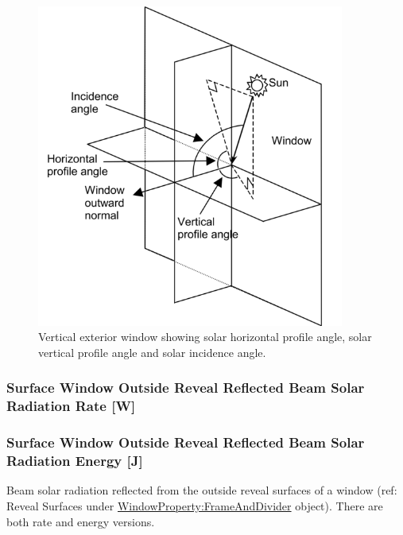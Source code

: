 \begin{figure}[hbtp] %
\centering
\includegraphics[width=0.9\textwidth, height=0.9\textheight, keepaspectratio=true]{media/image058.png}
\caption{Vertical exterior window showing solar horizontal profile angle, solar vertical profile angle and solar incidence angle. \protect \label{fig:vertical-exterior-window-showing-solar}}
\end{figure}

\subsubsection{Surface Window Outside Reveal Reflected Beam Solar Radiation Rate {[}W{]}}\label{surface-window-outside-reveal-reflected-beam-solar-radiation-rate-w}

\subsubsection{Surface Window Outside Reveal Reflected Beam Solar Radiation Energy {[}J{]}}\label{surface-window-outside-reveal-reflected-beam-solar-radiation-energy-j}

Beam solar radiation reflected from the outside reveal surfaces of a window (ref: Reveal Surfaces under \hyperref[windowpropertyframeanddivider]{WindowProperty:FrameAndDivider} object). There are both rate and energy versions.

